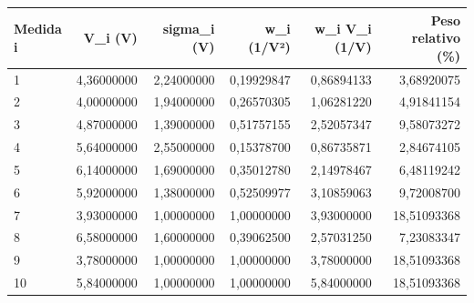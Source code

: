\begin{tabular}{lrrrrr}
\toprule
Medida i & V\_i (V) & sigma\_i (V) & w\_i (1/V²) & w\_i V\_i (1/V) & Peso relativo (\%) \\
\midrule
1 & 4,36000000 & 2,24000000 & 0,19929847 & 0,86894133 & 3,68920075 \\
2 & 4,00000000 & 1,94000000 & 0,26570305 & 1,06281220 & 4,91841154 \\
3 & 4,87000000 & 1,39000000 & 0,51757155 & 2,52057347 & 9,58073272 \\
4 & 5,64000000 & 2,55000000 & 0,15378700 & 0,86735871 & 2,84674105 \\
5 & 6,14000000 & 1,69000000 & 0,35012780 & 2,14978467 & 6,48119242 \\
6 & 5,92000000 & 1,38000000 & 0,52509977 & 3,10859063 & 9,72008700 \\
7 & 3,93000000 & 1,00000000 & 1,00000000 & 3,93000000 & 18,51093368 \\
8 & 6,58000000 & 1,60000000 & 0,39062500 & 2,57031250 & 7,23083347 \\
9 & 3,78000000 & 1,00000000 & 1,00000000 & 3,78000000 & 18,51093368 \\
10 & 5,84000000 & 1,00000000 & 1,00000000 & 5,84000000 & 18,51093368 \\
\bottomrule
\end{tabular}
